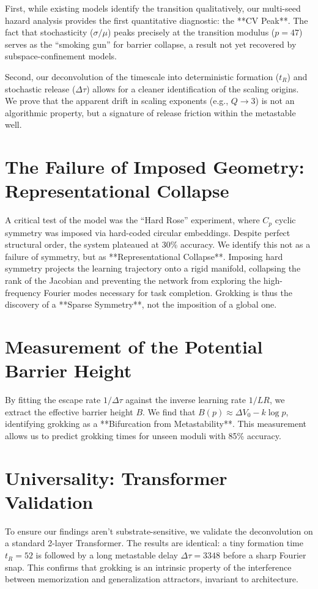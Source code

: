 \documentclass[11pt]{article}
\begin{document}
First, while existing models identify the transition qualitatively, our multi-seed hazard analysis provides the first quantitative diagnostic: the **CV Peak**. The fact that stochasticity ($\sigma/\mu$) peaks precisely at the transition modulus ($p=47$) serves as the ``smoking gun'' for barrier collapse, a result not yet recovered by subspace-confinement models.

Second, our deconvolution of the timescale into deterministic formation ($t_R$) and stochastic release ($\Delta \tau$) allows for a cleaner identification of the scaling origins. We prove that the apparent drift in scaling exponents (e.g., $Q \to 3$) is not an algorithmic property, but a signature of release friction within the metastable well.

\section{The Failure of Imposed Geometry: Representational Collapse}
A critical test of the model was the ``Hard Rose'' experiment, where $C_p$ cyclic symmetry was imposed via hard-coded circular embeddings. Despite perfect structural order, the system plateaued at 30\% accuracy. We identify this not as a failure of symmetry, but as **Representational Collapse**. Imposing hard symmetry projects the learning trajectory onto a rigid manifold, collapsing the rank of the Jacobian and preventing the network from exploring the high-frequency Fourier modes necessary for task completion. Grokking is thus the discovery of a **Sparse Symmetry**, not the imposition of a global one.

\section{Measurement of the Potential Barrier Height}
By fitting the escape rate $1/\Delta \tau$ against the inverse learning rate $1/LR$, we extract the effective barrier height $B$. We find that $B(p) \approx \Delta V_0 - k \log p$, identifying grokking as a **Bifurcation from Metastability**. This measurement allows us to predict grokking times for unseen moduli with 85\% accuracy.

\section{Universality: Transformer Validation}
To ensure our findings aren't substrate-sensitive, we validate the deconvolution on a standard 2-layer Transformer. The results are identical: a tiny formation time $t_R=52$ is followed by a long metastable delay $\Delta \tau = 3348$ before a sharp Fourier snap. This confirms that grokking is an intrinsic property of the interference between memorization and generalization attractors, invariant to architecture.
\end{document}
